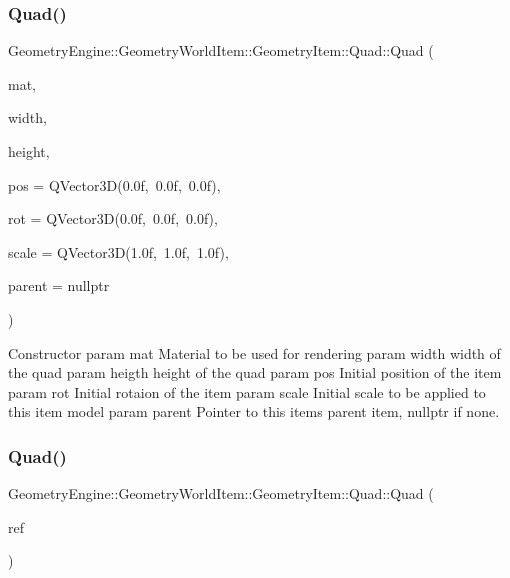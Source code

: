 \subsubsection{\texorpdfstring{Quad()}{Quad()}\hspace{0.1cm}{\footnotesize\ttfamily [1/2]}}
{\footnotesize\ttfamily Geometry\+Engine\+::\+Geometry\+World\+Item\+::\+Geometry\+Item\+::\+Quad\+::\+Quad (\begin{DoxyParamCaption}\item[{const \mbox{\hyperlink{class_geometry_engine_1_1_geometry_material_1_1_material}{Geometry\+Material\+::\+Material}} \&}]{mat,  }\item[{float}]{width,  }\item[{float}]{height,  }\item[{const Q\+Vector3D \&}]{pos = {\ttfamily QVector3D(0.0f,~0.0f,~0.0f)},  }\item[{const Q\+Vector3D \&}]{rot = {\ttfamily QVector3D(0.0f,~0.0f,~0.0f)},  }\item[{const Q\+Vector3D \&}]{scale = {\ttfamily QVector3D(1.0f,~1.0f,~1.0f)},  }\item[{\mbox{\hyperlink{class_geometry_engine_1_1_geometry_world_item_1_1_world_item}{World\+Item}} $\ast$}]{parent = {\ttfamily nullptr} }\end{DoxyParamCaption})}

Constructor param mat Material to be used for rendering param width width of the quad param heigth height of the quad param pos Initial position of the item param rot Initial rotaion of the item param scale Initial scale to be applied to this item model param parent Pointer to this items parent item, nullptr if none. \mbox{\label{class_geometry_engine_1_1_geometry_world_item_1_1_geometry_item_1_1_quad_a25d297ec0ae154e59539e8aac94de719}} 
\subsubsection{\texorpdfstring{Quad()}{Quad()}\hspace{0.1cm}{\footnotesize\ttfamily [2/2]}}
{\footnotesize\ttfamily Geometry\+Engine\+::\+Geometry\+World\+Item\+::\+Geometry\+Item\+::\+Quad\+::\+Quad (\begin{DoxyParamCaption}\item[{const \mbox{\hyperlink{class_geometry_engine_1_1_geometry_world_item_1_1_geometry_item_1_1_quad}{Quad}} \&}]{ref }\end{DoxyParamCaption})}

